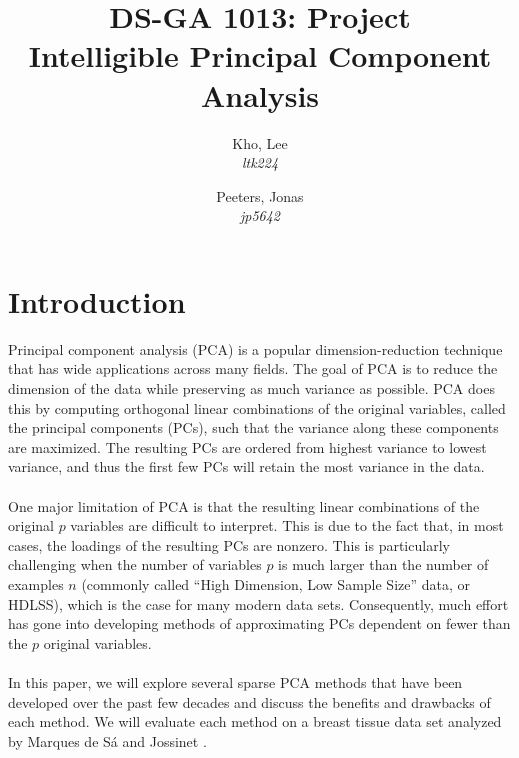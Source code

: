 \documentclass[11pt,letterpaper]{report}
\author{
	Kho, Lee\\
	\textit{ltk224}
	\and
	Peeters, Jonas\\
	\textit{jp5642}
}
\title{DS-GA 1013: Project\\Intelligible Principal Component Analysis}
\begin{document}
\maketitle
\section*{Introduction}

Principal component analysis (PCA) is a popular dimension-reduction technique that has wide applications across many fields. The goal of PCA is to reduce the dimension of the data while preserving as much variance as possible. PCA does this by computing orthogonal linear combinations of the original variables, called the principal components (PCs), such that the variance along these components are maximized.  The resulting PCs are ordered from highest variance to lowest variance, and thus the first few PCs will retain the most variance in the data.\\
\\
One major limitation of PCA is that the resulting linear combinations of the original $p$ variables are difficult to interpret. This is due to the fact that, in most cases, the loadings of the resulting PCs are nonzero. This is particularly challenging when the number of variables $p$ is much larger than the number of examples $n$ (commonly called “High Dimension, Low Sample Size” data, or HDLSS), which is the case for many modern data sets. Consequently, much effort has gone into developing methods of approximating PCs dependent on fewer than the $p$ original variables.\\
\\
In this paper, we will explore several sparse PCA methods that have been developed over the past few decades and discuss the benefits and drawbacks of each method. We will evaluate each method on a breast tissue data set analyzed by Marques de Sá and Jossinet \citeyear{da2000}.
\end{document}
